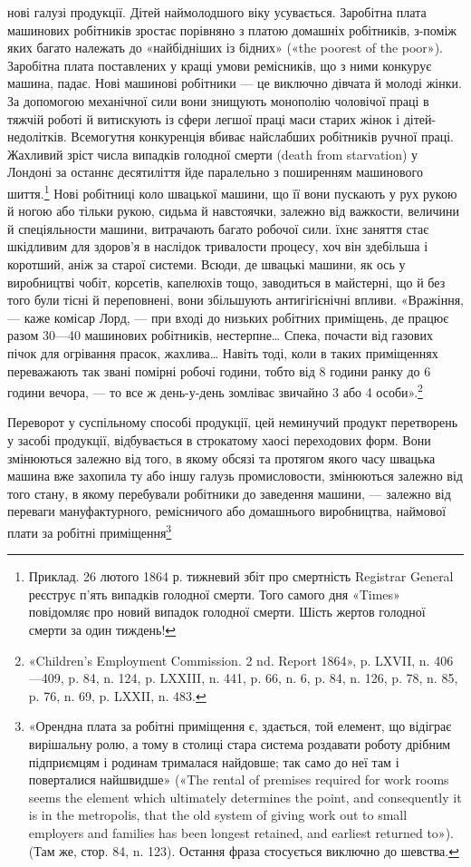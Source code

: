 \parcont{}  %
нові галузі продукції. Дітей наймолодшого віку усувається. Заробітна
плата машинових робітників зростає порівняно з платою
домашніх робітників, з-поміж яких багато належать до
«найбідніших із бідних» («the poorest of the poor»). Заробітна плата
поставлених у кращі умови ремісників, що з ними конкурує
машина, падає. Нові машинові робітники — це виключно дівчата
й молоді жінки. За допомогою механічної сили вони знищують
монополію чоловічої праці в тяжчій роботі й витискують із сфери
легшої праці маси старих жінок і дітей-недолітків. Всемогутня
конкуренція вбиває найслабших робітників ручної праці. Жахливий
зріст числа випадків голодної смерти (death from starvation)
у Лондоні за останнє десятиліття йде паралельно з поширенням
машинового шиття.\footnote{
Приклад. 26 лютого 1864 р. тижневий збіт про смертність Registrar
General реєструє п’ять випадків голодної смерти. Того самого
дня «Times» повідомляє про новий випадок голодної смерти. Шість жертов
голодної смерти за один тиждень!
} Нові робітниці коло швацької машини,
що її вони пускають у рух рукою й ногою або тільки рукою,
сидьма й навстоячки, залежно від важкости, величини й спеціяльности
машини, витрачають багато робочої сили. їхнє заняття стає
шкідливим для здоров’я в наслідок тривалости процесу, хоч він
здебільша і коротший, аніж за старої системи. Всюди, де швацькі
машини, як ось у виробництві чобіт, корсетів, капелюхів тощо,
заводиться в майстерні, що й без того були тісні й переповнені,
вони збільшують антигігієнічні впливи. «Вражіння, — каже комісар
Лорд, — при вході до низьких робітних приміщень, де працює
разом 30—40 машинових робітників, нестерпне\dots{} Спека, почасти
від газових пічок для огрівання прасок, жахлива\dots{} Навіть тоді,
коли в таких приміщеннях переважають так звані помірні робочі
години, тобто від 8 години ранку до 6 години вечора, — то все ж
день-у-день зомліває звичайно 3 або 4 особи».\footnote{
«Children’s Employment Commission. 2 nd. Report 1864», p. LXVII,
n. 406—409, p. 84, n. 124, p. LXXIII, n. 441, p. 66, n. 6, p. 84, n. 126,
p. 78, n. 85, p. 76, n. 69, p. LXXII, n. 483.
}

Переворот у суспільному способі продукції, цей неминучий
продукт перетворень у засобі продукції, відбувається в строкатому
хаосі переходових форм. Вони змінюються залежно від того,
в якому обсязі та протягом якого часу швацька машина вже захопила
ту або іншу галузь промисловости, змінюються залежно
від того стану, в якому перебували робітники до заведення
машини, — залежно від переваги мануфактурного, ремісничого або
домашнього виробництва, наймової плати за робітні приміщення\footnote{
«Орендна плата за робітні приміщення є, здається, той елемент,
що відіграє вирішальну ролю, а тому в столиці стара система роздавати
роботу дрібним підприємцям і родинам трималася найдовше; так само
до неї там і поверталися найшвидше» («The rental of premises required
for work rooms seems the element which ultimately determines the point,
and consequently it is in the metropolis, that the old system of giving work
out to small employers and families has been longest retained, and earliest
returned to»). (Там же, стор. 84, n. 123). Остання фраза стосується виключно
до шевства.
}
\parbreak{}  %
